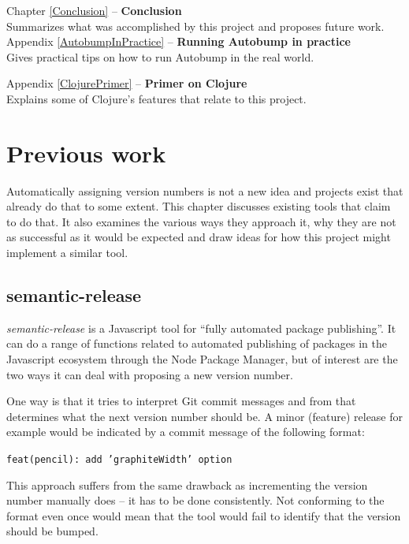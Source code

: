 \documentclass{l4proj}
\begin{document}
\noindent Chapter \ref{Conclusion} -- \textbf{Conclusion} \\
Summarizes what was accomplished by this project and proposes future work.
\\

\noindent Appendix \ref{AutobumpInPractice} -- \textbf{Running
Autobump in practice} \\
Gives practical tips on how to run Autobump in the real world.

\noindent Appendix \ref{ClojurePrimer} -- \textbf{Primer on Clojure}
\\
Explains some of Clojure's features that relate to this project.

\chapter{Previous work}
\label{PreviousWork}

Automatically assigning version numbers is not a new idea and projects
exist that already do that to some extent.
This chapter discusses existing tools that claim to do that. It also
examines the various ways they approach it, why they are not as
successful as it would be expected and draw ideas for how this project
might implement a similar tool.

\section{semantic-release}

\textit{semantic-release} \cite{SemanticRelease} is a Javascript tool
for ``fully automated package publishing''. It can do a range of
functions related to automated publishing of packages in the
Javascript ecosystem through the Node Package Manager, but of interest
are the two ways it can deal with proposing a new version number.

One way is that it tries to interpret Git commit messages and from
that determines what the next version number should be. A minor
(feature) release for example would be indicated by a commit message
of the following format:

\begin{center}
\texttt{feat(pencil): add 'graphiteWidth' option}
\end{center}

This approach suffers from the same drawback as incrementing the
version number manually does -- it has to be done consistently.
Not conforming to the format even once would mean that the tool would
fail to identify that the version should be bumped.
\end{document}

